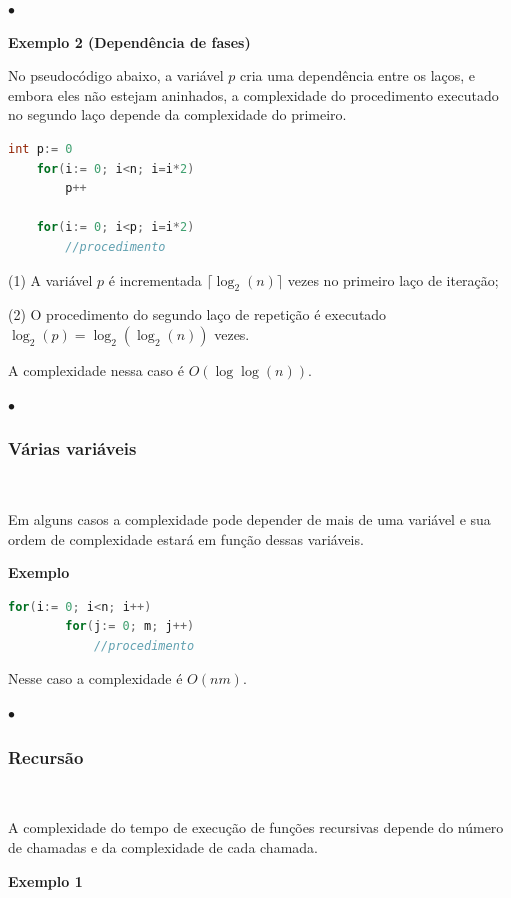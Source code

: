 {\raggedleft $\bullet$ \par}

\textbf{Exemplo 2 (Dependência de fases)}  

No pseudocódigo abaixo, a variável $p$ cria uma dependência entre os laços, e embora eles não estejam aninhados, a complexidade do procedimento executado no segundo laço depende da complexidade do primeiro.

\begin{lstlisting}[language=C, frame=single]
    int p:= 0
    for(i:= 0; i<n; i=i*2)
        p++
    
    for(i:= 0; i<p; i=i*2)
        //procedimento
\end{lstlisting}

(1) A variável $p$ é incrementada $\lceil \log_2(n) \rceil$ vezes no primeiro laço de iteração;

(2) O procedimento do segundo laço de repetição é executado $\log_2(p) = \log_2(\log_2(n))$ vezes.

A complexidade nessa caso é $O(\log\log(n))$.

{\raggedleft $\bullet$ \par}

\subsubsection{Várias variáveis}
\

Em alguns casos a complexidade pode depender de mais de uma variável e sua ordem de complexidade estará em função dessas variáveis.

\textbf{Exemplo}  

\begin{lstlisting}[language=C, frame=single]
    for(i:= 0; i<n; i++)
        for(j:= 0; m; j++)
            //procedimento
\end{lstlisting}

Nesse caso a complexidade é $O(nm)$.

{\raggedleft $\bullet$ \par}

\subsubsection{Recursão}
\

A complexidade do tempo de execução de funções recursivas depende do número de chamadas e da complexidade de cada chamada.

\textbf{Exemplo 1} 

